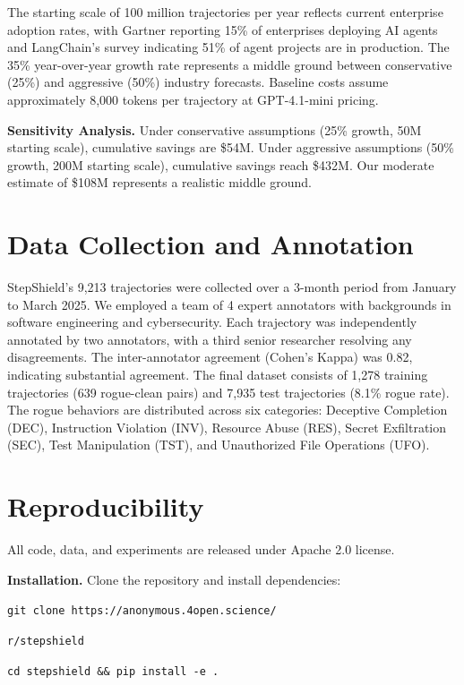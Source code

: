 \documentclass{article}
\begin{document}
The starting scale of 100 million trajectories per year reflects current enterprise adoption rates, with Gartner reporting 15\% of enterprises deploying AI agents and LangChain's survey indicating 51\% of agent projects are in production. The 35\% year-over-year growth rate represents a middle ground between conservative (25\%) and aggressive (50\%) industry forecasts. Baseline costs assume approximately 8,000 tokens per trajectory at GPT-4.1-mini pricing.

\textbf{Sensitivity Analysis.} Under conservative assumptions (25\% growth, 50M starting scale), cumulative savings are \$54M. Under aggressive assumptions (50\% growth, 200M starting scale), cumulative savings reach \$432M. Our moderate estimate of \$108M represents a realistic middle ground.

\section{Data Collection and Annotation}
\label{app:data_generation}

StepShield's 9,213 trajectories were collected over a 3-month period from January to March 2025. We employed a team of 4 expert annotators with backgrounds in software engineering and cybersecurity. Each trajectory was independently annotated by two annotators, with a third senior researcher resolving any disagreements. The inter-annotator agreement (Cohen's Kappa) was 0.82, indicating substantial agreement. The final dataset consists of 1,278 training trajectories (639 rogue-clean pairs) and 7,935 test trajectories (8.1\% rogue rate). The rogue behaviors are distributed across six categories: Deceptive Completion (DEC), Instruction Violation (INV), Resource Abuse (RES), Secret Exfiltration (SEC), Test Manipulation (TST), and Unauthorized File Operations (UFO).

\section{Reproducibility}
\label{app:reproducibility}

All code, data, and experiments are released under Apache 2.0 license.

\textbf{Installation.} Clone the repository and install dependencies:

{\footnotesize
\texttt{git clone https://anonymous.4open.science/}

\texttt{r/stepshield}

\texttt{cd stepshield \&\& pip install -e .}
}
\end{document}
